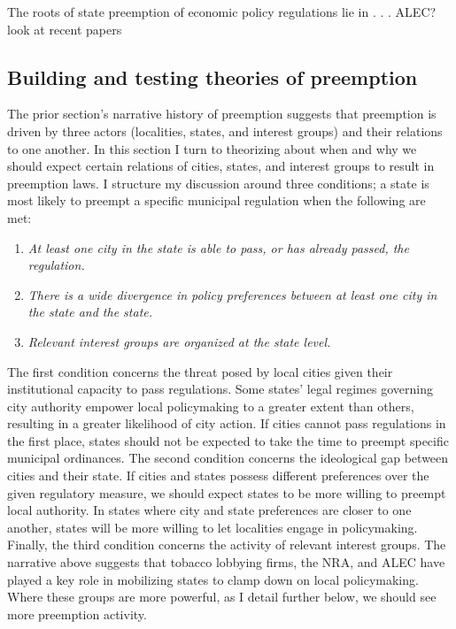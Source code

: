 \documentclass[12pt]{article}
\begin{document}
The roots of state preemption of economic policy regulations lie in . . . 
ALEC? look at recent papers 


\subsection*{Building and testing theories of preemption}
The prior section's narrative history of preemption suggests that preemption is driven by three actors (localities, states, and interest groups) and their relations to one another. In this section I turn to theorizing about when and why we should expect certain relations of cities, states, and interest groups to result in preemption laws. I structure my discussion around three conditions; a state is most likely to preempt a specific municipal regulation when the following are met:

\singlespacing
\begin{enumerate}
	\item \textit{At least one city in the state is able to pass, or has already passed, the regulation.}
	\item \textit{There is a wide divergence in policy preferences between at least one city in the state and the state.}
	\item \textit{Relevant interest groups are organized at the state level.}
\end{enumerate}

The first condition concerns the threat posed by local cities given their institutional capacity to pass regulations. Some states' legal regimes governing city authority empower local policymaking to a greater extent than others, resulting in a greater likelihood of city action. If cities cannot pass regulations in the first place, states should not be expected to take the time to preempt specific municipal ordinances. The second condition concerns the ideological gap between cities and their state. If cities and states possess different preferences over the given regulatory measure, we should expect states to be more willing to preempt local authority. In states where city and state preferences are closer to one another, states will be more willing to let localities engage in policymaking. Finally, the third condition concerns the activity of relevant interest groups. The narrative above suggests that tobacco lobbying firms, the NRA, and ALEC have played a key role in mobilizing states to clamp down on local policymaking. Where these groups are more powerful, as I detail further below, we should see more preemption activity. 
\end{document}
